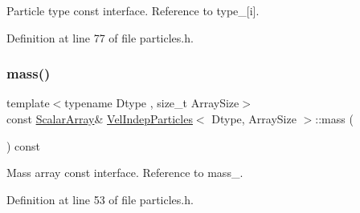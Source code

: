 Particle type const interface. Reference to type\+\_\+\mbox{[}i\mbox{]}. 



Definition at line 77 of file particles.\+h.

\mbox{\label{class_vel_indep_particles_ab2b7a9718d112bc2713448f9055a0833}} 
\subsubsection{\texorpdfstring{mass()}{mass()}\hspace{0.1cm}{\footnotesize\ttfamily [1/2]}}
{\footnotesize\ttfamily template$<$typename Dtype , size\+\_\+t Array\+Size$>$ \\
const \mbox{\hyperlink{class_vel_indep_particles_abd6e6b0ffbbab4ebc078efd77f6a365a}{Scalar\+Array}}\& \mbox{\hyperlink{class_vel_indep_particles}{Vel\+Indep\+Particles}}$<$ Dtype, Array\+Size $>$\+::mass (\begin{DoxyParamCaption}{ }\end{DoxyParamCaption}) const\hspace{0.3cm}{\ttfamily [inline]}}



Mass array const interface. Reference to mass\+\_\+. 



Definition at line 53 of file particles.\+h.


